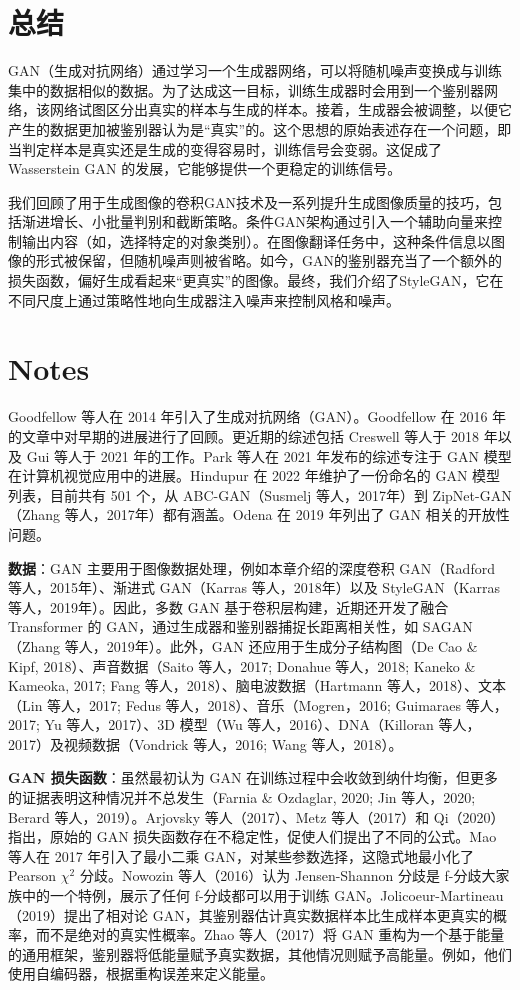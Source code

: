 \section{总结}
GAN（生成对抗网络）通过学习一个生成器网络，可以将随机噪声变换成与训练集中的数据相似的数据。为了达成这一目标，训练生成器时会用到一个鉴别器网络，该网络试图区分出真实的样本与生成的样本。接着，生成器会被调整，以便它产生的数据更加被鉴别器认为是“真实”的。这个思想的原始表述存在一个问题，即当判定样本是真实还是生成的变得容易时，训练信号会变弱。这促成了 Wasserstein GAN 的发展，它能够提供一个更稳定的训练信号。

我们回顾了用于生成图像的卷积GAN技术及一系列提升生成图像质量的技巧，包括渐进增长、小批量判别和截断策略。条件GAN架构通过引入一个辅助向量来控制输出内容（如，选择特定的对象类别）。在图像翻译任务中，这种条件信息以图像的形式被保留，但随机噪声则被省略。如今，GAN的鉴别器充当了一个额外的损失函数，偏好生成看起来“更真实”的图像。最终，我们介绍了StyleGAN，它在不同尺度上通过策略性地向生成器注入噪声来控制风格和噪声。

\section{Notes}
Goodfellow 等人在 2014 年引入了生成对抗网络（GAN）。Goodfellow 在 2016 年的文章中对早期的进展进行了回顾。更近期的综述包括 Creswell 等人于 2018 年以及 Gui 等人于 2021 年的工作。Park 等人在 2021 年发布的综述专注于 GAN 模型在计算机视觉应用中的进展。Hindupur 在 2022 年维护了一份命名的 GAN 模型列表，目前共有 501 个，从 ABC-GAN（Susmelj 等人，2017年）到 ZipNet-GAN（Zhang 等人，2017年）都有涵盖。Odena 在 2019 年列出了 GAN 相关的开放性问题。

\textbf{数据}：GAN 主要用于图像数据处理，例如本章介绍的深度卷积 GAN（Radford 等人，2015年）、渐进式 GAN（Karras 等人，2018年）以及 StyleGAN（Karras 等人，2019年）。因此，多数 GAN 基于卷积层构建，近期还开发了融合 Transformer 的 GAN，通过生成器和鉴别器捕捉长距离相关性，如 SAGAN（Zhang 等人，2019年）。此外，GAN 还应用于生成分子结构图（De Cao \& Kipf, 2018）、声音数据（Saito 等人，2017; Donahue 等人，2018; Kaneko \& Kameoka, 2017; Fang 等人，2018）、脑电波数据（Hartmann 等人，2018）、文本（Lin 等人，2017; Fedus 等人，2018）、音乐（Mogren，2016; Guimaraes 等人，2017; Yu 等人，2017）、3D 模型（Wu 等人，2016）、DNA（Killoran 等人，2017）及视频数据（Vondrick 等人，2016; Wang 等人，2018）。

\textbf{GAN 损失函数}：虽然最初认为 GAN 在训练过程中会收敛到纳什均衡，但更多的证据表明这种情况并不总发生（Farnia \& Ozdaglar, 2020; Jin 等人，2020; Berard 等人，2019）。Arjovsky 等人（2017）、Metz 等人（2017）和 Qi（2020）指出，原始的 GAN 损失函数存在不稳定性，促使人们提出了不同的公式。Mao 等人在 2017 年引入了最小二乘 GAN，对某些参数选择，这隐式地最小化了 Pearson \(\chi^2\) 分歧。Nowozin 等人（2016）认为 Jensen-Shannon 分歧是 f-分歧大家族中的一个特例，展示了任何 f-分歧都可以用于训练 GAN。Jolicoeur-Martineau（2019）提出了相对论 GAN，其鉴别器估计真实数据样本比生成样本更真实的概率，而不是绝对的真实性概率。Zhao 等人（2017）将 GAN 重构为一个基于能量的通用框架，鉴别器将低能量赋予真实数据，其他情况则赋予高能量。例如，他们使用自编码器，根据重构误差来定义能量。

